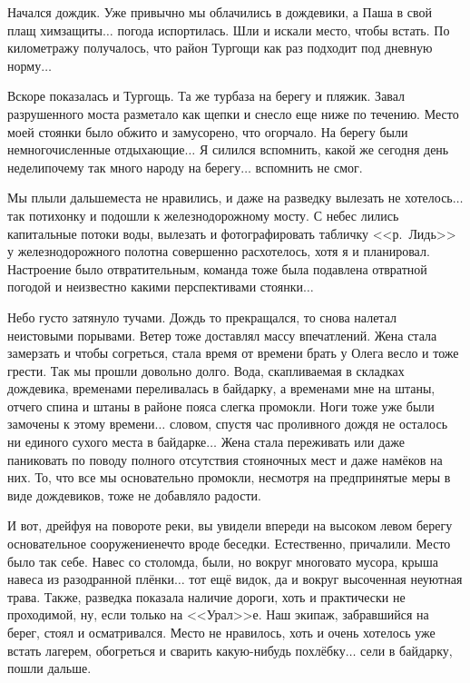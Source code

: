 Начался дождик. Уже привычно мы облачились в дождевики, а Паша в свой плащ химзащиты$\ldots$ погода испортилась. Шли и искали место, чтобы встать. По километражу получалось, что район Тургощи как раз подходит под дневную норму$\ldots$

Вскоре показалась и Тургощь. Та же турбаза на берегу и пляжик. Завал разрушенного моста разметало как щепки и снесло еще ниже по течению. Место моей стоянки было обжито и замусорено, что огорчало. На берегу были немногочисленные отдыхающие$\ldots$ Я силился вспомнить, какой же сегодня день недели\mdash почему так много народу на берегу$\ldots$ вспомнить не смог. 

Мы плыли дальше\mdash места не нравились, и даже на разведку вылезать не хотелось$\ldots$ так потихонку и подошли к железнодорожному мосту. С небес лились капитальные потоки воды, вылезать и фотографировать табличку <<р.~Лидь>> у железнодорожного полотна совершенно расхотелось, хотя я и планировал. Настроение было отвратительным, команда тоже была подавлена отвратной погодой и неизвестно какими перспективами стоянки$\ldots$

Небо густо затянуло тучами. Дождь то прекращался, то снова налетал неистовыми порывами. Ветер тоже доставлял массу впечатлений. Жена стала замерзать и чтобы согреться, стала время от времени брать у Олега весло и тоже грести. Так мы прошли довольно долго. Вода, скапливаемая в складках дождевика, временами переливалась в байдарку, а временами мне на штаны, отчего спина и штаны в районе пояса слегка промокли. Ноги тоже уже были замочены к этому времени$\ldots$ словом, спустя час проливного дождя не осталось ни единого сухого места в байдарке$\ldots$ Жена стала переживать или даже паниковать по поводу полного отсутствия стояночных мест и даже намёков на них. То, что все мы основательно промокли, несмотря на предпринятые меры в виде дождевиков, тоже не добавляло радости.

И вот, дрейфуя на повороте реки, вы увидели впереди на высоком левом берегу основательное сооружение\mdash нечто вроде беседки. Естественно, причалили. Место было так себе. Навес со столом\mdash да, были, но вокруг многовато мусора, крыша навеса из разодранной плёнки$\ldots$ тот ещё видок, да и вокруг высоченная неуютная трава. Также, разведка показала наличие дороги, хоть и практически не проходимой, ну, если только на <<Урал>>\sdash е. Наш экипаж, забравшийся на берег, стоял и осматривался. Место не нравилось, хоть и очень хотелось уже встать лагерем, обогреться и сварить какую-нибудь похлёбку$\ldots$ сели в байдарку, пошли дальше.

